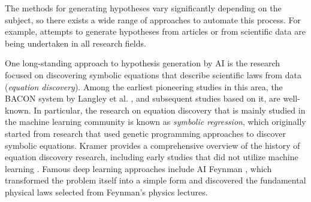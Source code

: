 \documentclass{article}
\begin{document}
The methods for generating hypotheses vary significantly depending on the subject, so there exists a wide range of approaches to automate this process. For example, attempts to generate hypotheses from articles or from scientific data are being undertaken in all research fields. 

One long-standing approach to hypothesis generation by AI is the research focused on discovering symbolic equations that describe scientific laws from data (\textit{equation discovery}). Among the earliest pioneering studies in this area, the BACON system by Langley et al. \cite{langley1987scientific}, and subsequent studies based on it, are well-known. In particular, the research on equation discovery that is mainly studied in the machine learning community is known as \textit{symbolic regression}, which originally started from research that used genetic programming approaches to discover symbolic equations.
 Kramer provides a comprehensive overview of the history of equation discovery research, including early studies that did not utilize machine learning \cite{kramer2023automated}. Famous deep learning approaches include AI Feynman \cite{udrescu2020ai,udrescu2020ai2}, which transformed the problem itself into a simple form and discovered the fundamental physical laws selected from Feynman's physics lectures.

\end{document}
